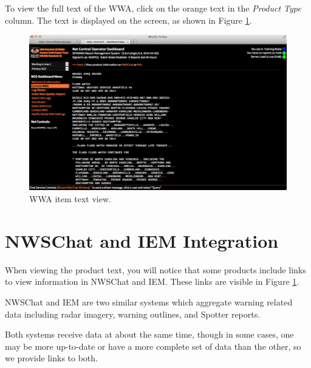 \documentclass[pdflatex,letterpaper,twoside,12pt]{book}
\begin{document}
To view the full text of the WWA, click on the orange text in the \emph{Product Type} column.  The text is displayed on the screen, as shown in Figure \ref{fig:dash-wwa-item}.

\begin{figure}[t]
  \centering
  \includegraphics[width=\textwidth,keepaspectratio=true]{img/dash-wwa-item}
  \caption{WWA item text view.\label{fig:dash-wwa-item}}
\end{figure}


\section{NWSChat and IEM Integration}\label{iem-integration}

When viewing the product text, you will notice that some products include links to view information in NWSChat and IEM.  These links are visible in Figure \ref{fig:dash-wwa-item}.

NWSChat and IEM are two similar systems which aggregate warning related data including radar imagery, warning outlines, and Spotter reports.

Both systems receive data at about the same time, though in some cases, one may be more up-to-date or have a more complete set of data than the other, so we provide links to both.

\end{document}
